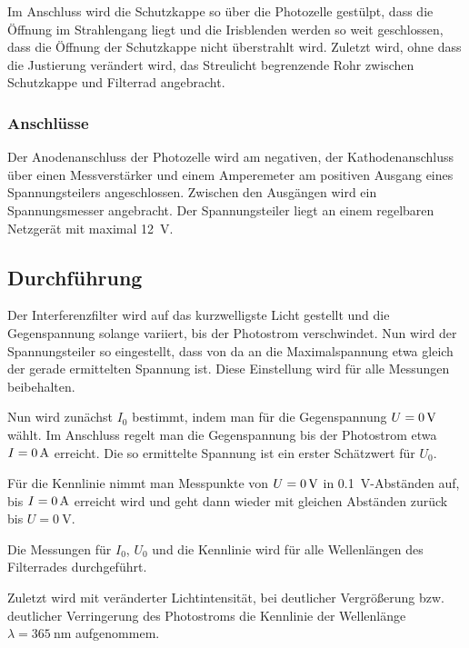Im Anschluss wird die Schutzkappe so über die Photozelle gestülpt, dass
die Öffnung im Strahlengang liegt und die Irisblenden werden so weit
geschlossen, dass die Öffnung der Schutzkappe nicht überstrahlt wird.
Zuletzt wird, ohne dass die Justierung verändert wird, das Streulicht
begrenzende Rohr zwischen Schutzkappe und Filterrad angebracht.

\FloatBarrier
\subsubsection{Anschlüsse}

Der Anodenanschluss der Photozelle wird am negativen, der Kathodenanschluss
über einen Messverstärker und einem Amperemeter am positiven Ausgang eines
Spannungsteilers angeschlossen. Zwischen den Ausgängen wird ein Spannungsmesser
angebracht. Der Spannungsteiler liegt an einem regelbaren Netzgerät mit maximal
\SI{12}{\volt}.

\FloatBarrier
\subsection{Durchführung}

Der Interferenzfilter wird auf das kurzwelligste Licht gestellt und die
Gegenspannung solange variiert, bis der Photostrom verschwindet. Nun wird der
Spannungsteiler so eingestellt, dass von da an die Maximalspannung etwa gleich
der gerade ermittelten Spannung ist. Diese Einstellung wird für alle Messungen
beibehalten.

Nun wird zunächst $I_0$ bestimmt, indem man für die Gegenspannung $U =
\SI0{\volt}$ wählt. Im Anschluss regelt man die Gegenspannung bis der
Photostrom etwa $I = \SI0{\ampere}$ erreicht. Die so ermittelte Spannung ist
ein erster Schätzwert für $U_0$.

Für die Kennlinie nimmt man Messpunkte von $U = \SI0{\volt}$ in
\SI{0.1}{\volt}-Abständen auf, bis $I = \SI0{\ampere}$ erreicht wird und geht
dann wieder mit gleichen Abständen zurück bis $U = \SI{0}{\volt}$.

Die Messungen für $I_0$, $U_0$ und die Kennlinie wird für alle Wellenlängen des
Filterrades durchgeführt.

Zuletzt wird mit veränderter Lichtintensität, bei deutlicher Vergrößerung bzw.
deutlicher Verringerung des Photostroms die Kennlinie der Wellenlänge $\lambda
= \SI{365}{\nano\meter}$ aufgenommem.


\FloatBarrier
